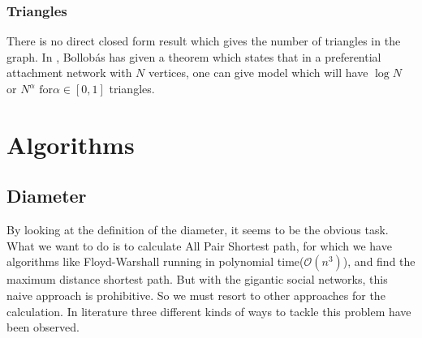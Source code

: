\documentclass[12pt]{article}
\begin{document}
\subsubsection{Triangles}
There is no direct closed form result which gives the number of triangles in the graph. In \cite{bollobas_triangles}, Bollob\'as has given a theorem which states that in a preferential attachment network with $N$ vertices, one can give model which will have $\log N$ or $N^{\alpha} \text{ for} \alpha \in [0, 1]$ triangles.

\section{Algorithms}
\subsection{Diameter}
By looking at the definition of the diameter, it seems to be the obvious task. What we want to do is to calculate All Pair Shortest path, for which we have algorithms like Floyd-Warshall running in polynomial time($\mathcal{O}(n^3)$), and find the maximum distance shortest path. But with the gigantic social networks, this naive approach is prohibitive. So we must resort to other approaches for the calculation. In literature three different kinds of ways to tackle this problem have been observed.
\end{document}
